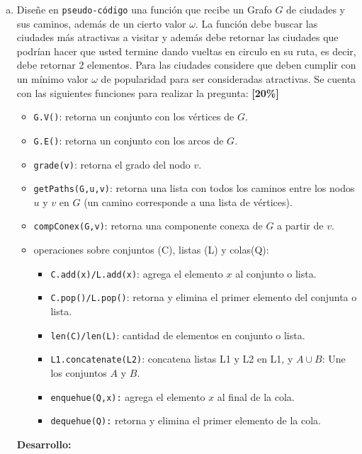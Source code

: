 \documentclass[letterpaper,10pt]{article}
\begin{document}
\begin{enumerate}[a)]
    \item Diseñe en \texttt{pseudo-código} una función que recibe un Grafo $G$ de ciudades y sus caminos, además de un cierto valor $\omega$. La función debe buscar las ciudades más atractivas a visitar y además debe retornar las ciudades que podrían hacer que usted termine dando vueltas en circulo en su ruta, es decir, debe retornar 2 elementos. Para las ciudades considere que deben cumplir con un mínimo valor $\omega$ de popularidad para ser consideradas atractivas. Se cuenta con las siguientes funciones para realizar la pregunta: \textbf{[20\%]}
    \begin{itemize}
        \item \texttt{G.V()}: retorna un conjunto con los vértices de $G$.
        \item \texttt{G.E()}: retorna un conjunto con  los arcos de $G$.
        \item \texttt{grade(v)}: retorna el grado del nodo $v$.
        \item \texttt{getPaths(G,u,v)}: retorna una lista con todos los caminos entre los nodos $u$ y $v$ en $G$ (un camino corresponde a una lista de vértices).
        \item \texttt{compConex(G,v)}: retorna una componente conexa de $G$ a partir de $v$.
        \item operaciones sobre conjuntos (C), listas (L) y colas(Q):
        \begin{itemize}
            \item \texttt{C.add(x)/L.add(x)}: agrega el elemento $x$ al conjunto o lista.
            \item \texttt{C.pop()/L.pop()}: retorna y elimina el primer elemento del conjunta o lista.
            \item \texttt{len(C)/len(L)}: cantidad de elementos en conjunto o lista.
            \item \texttt{L1.concatenate(L2)}: concatena listas L1 y L2 en L1, y $A \cup B$: Une los conjuntos $A$ y $B$.
            \item \texttt{enquehue(Q,x):} agrega el elemento $x$ al final de la cola.
            \item \texttt{dequehue(Q):} retorna y elimina el primer elemento de la cola.
        \end{itemize}
    \end{itemize}
\textbf{Desarrollo:}\\
\newline

\end{enumerate}
\end{document}
